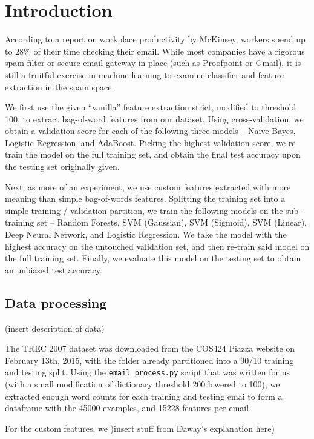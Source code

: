 \documentclass{article} %
\begin{document}
\section{Introduction}
According to a report on workplace productivity by McKinsey, workers spend up to 28\% of their time checking their email.  While most companies have a rigorous spam filter or secure email gateway in place (such as Proofpoint or Gmail), it is still a fruitful exercise in machine learning to examine classifier and feature extraction in the spam space.\par 
We first use the given ``vanilla'' feature extraction strict, modified to threshold 100, to extract bag-of-word features from our dataset.  Using cross-validation, we obtain a validation score for each of the following three models -- Naive Bayes, Logistic Regression, and AdaBoost.  Picking the highest validation score, we re-train the model on the full training set, and obtain the final test accuracy upon the testing set originally given.\par 
Next, as more of an experiment, we use custom features extracted with more meaning than simple bag-of-words features.  Splitting the training set into a simple training / validation partition, we train the following models on the sub-training set -- Random Forests, SVM (Gaussian), SVM (Sigmoid), SVM (Linear), Deep Neural Network, and Logistic Regression.  We take the model with the highest accuracy on the untouched validation set, and then re-train said model on the full training set.  Finally, we evaluate this model on the testing set to obtain an unbiased test accuracy.
%
\subsection{Data processing}
(insert description of data)\par 
The TREC 2007 dataset was downloaded from the COS424 Piazza website on February 13th, 2015, with the folder already partitioned into a 90/10 training and testing split.  Using the \lstinline{email_process.py}\lstinline{} script that was written for us (with a small modification of dictionary threshold 200 lowered to 100), we extracted enough word counts for each training and testing emai to form a dataframe with the 45000 examples, and 15228 features per email.\par 
For the custom features, we )insert stuff from Daway's explanation here)
\end{document}
